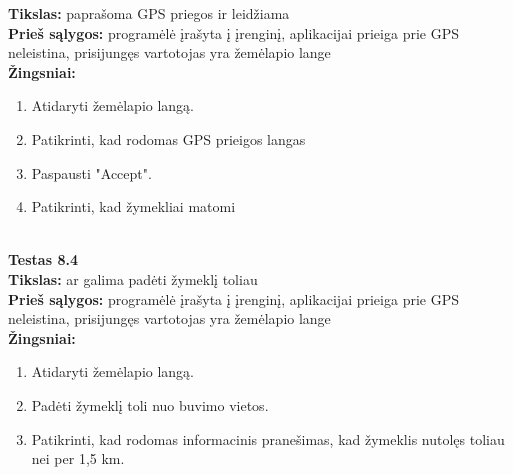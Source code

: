 \documentclass{VUMIFPSkursinis}
\begin{document}
		\textbf{Tikslas:} paprašoma GPS priegos ir leidžiama\\
		\textbf{Prieš sąlygos:} programėlė įrašyta į įrenginį, aplikacijai prieiga prie GPS neleistina, prisijungęs vartotojas yra žemėlapio lange\\
		\textbf{Žingsniai:}
		\begin{enumerate}[noitemsep,topsep=0pt]
			\item Atidaryti žemėlapio langą.
			\item Patikrinti, kad rodomas GPS prieigos langas
			\item Paspausti "Accept".
			\item Patikrinti, kad žymekliai matomi
		\end{enumerate}
		\textbf{}\\
		\textbf{Testas 8.4}\\
		\textbf{Tikslas:} ar galima padėti žymeklį toliau\\
		\textbf{Prieš sąlygos:} programėlė įrašyta į įrenginį, aplikacijai prieiga prie GPS neleistina, prisijungęs vartotojas yra žemėlapio lange\\
		\textbf{Žingsniai:}
		\begin{enumerate}[noitemsep,topsep=0pt]
			\item Atidaryti žemėlapio langą.
			\item Padėti žymeklį toli nuo buvimo vietos.
			\item Patikrinti, kad rodomas informacinis pranešimas, kad žymeklis nutolęs toliau nei per 1,5 km.
		\end{enumerate}
\end{document}
